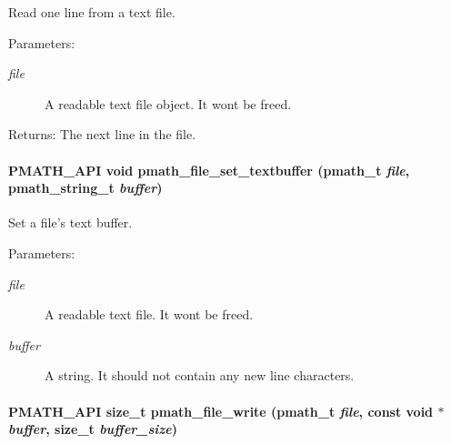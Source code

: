 Read one line from a text file. 

\begin{Desc}
\item[Parameters:]
\begin{description}
\item[{\em file}]A readable text file object. It wont be freed. \end{description}
\end{Desc}
\begin{Desc}
\item[Returns:]The next line in the file. \end{Desc}
\hypertarget{group__file__api_g84c177ddfd1eeaa2b8b5fd5aafbf16a1}{
\paragraph[{pmath\_\-file\_\-set\_\-textbuffer}]{\setlength{\rightskip}{0pt plus 5cm}PMATH\_\-API void pmath\_\-file\_\-set\_\-textbuffer ({\bf pmath\_\-t} {\em file}, \/  {\bf pmath\_\-string\_\-t} {\em buffer})}\hfill}
\label{group__file__api_g84c177ddfd1eeaa2b8b5fd5aafbf16a1}


Set a file's text buffer. 

\begin{Desc}
\item[Parameters:]
\begin{description}
\item[{\em file}]A readable text file. It wont be freed. \item[{\em buffer}]A string. It should not contain any new line characters. \end{description}
\end{Desc}
\hypertarget{group__file__api_g085f074227d8d7ed82c0fba82fa43109}{
\paragraph[{pmath\_\-file\_\-write}]{\setlength{\rightskip}{0pt plus 5cm}PMATH\_\-API size\_\-t pmath\_\-file\_\-write ({\bf pmath\_\-t} {\em file}, \/  const void $\ast$ {\em buffer}, \/  size\_\-t {\em buffer\_\-size})}\hfill}
\label{group__file__api_g085f074227d8d7ed82c0fba82fa43109}


